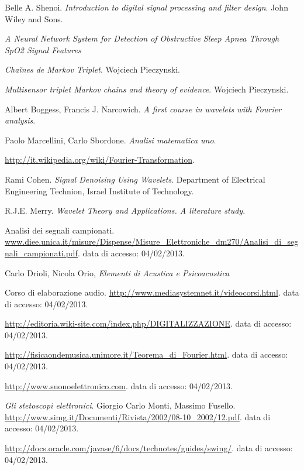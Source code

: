 \begin{thebibliography}{99}
  Belle A. Shenoi.
  \emph{Introduction to digital signal processing and filter design}.
  John Wiley and Sons.

  \emph{A Neural Network System for Detection of Obstructive Sleep Apnea Through SpO2 Signal Features}

  \emph{Cha\v ines de Markov Triplet}.
  Wojciech Pieczynski.

  \emph{Multisensor triplet Markov chains and theory of evidence}.
  Wojciech Pieczynski.


  Albert Boggess, Francis J. Narcowich.
  \emph{A first course in wavelets with Fourier analysis}.
  
  Paolo Marcellini, Carlo Sbordone.
  \emph{Analisi matematica uno}.

  \url{http://it.wikipedia.org/wiki/Fourier-Transformation}.


  Rami Cohen.
  \emph{Signal Denoising Using Wavelets}.
  Department of Electrical Engineering Technion, Israel Institute of Technology.


  R.J.E. Merry.
  \emph{Wavelet Theory and Applications. A literature study}.
   
  Analisi dei segnali campionati.
  \url{www.diee.unica.it/misure/Dispense/Misure_Elettroniche_dm270/Analisi_di_segnali_campionati.pdf}.
  data di accesso: 04/02/2013.

  Carlo Drioli, Nicola Orio,
  \emph{Elementi di Acustica e Psicoacustica}


  Corso di elaborazione audio.
  \url{http://www.mediasystemnet.it/videocorsi.html}.
  data di accesso: 04/02/2013.


  \url{http://editoria.wiki-site.com/index.php/DIGITALIZZAZIONE}.
  data di accesso: 04/02/2013.

  \url{http://fisicaondemusica.unimore.it/Teorema_di_Fourier.html}.
  data di accesso: 04/02/2013.


  \url {http://www.suonoelettronico.com}.
  data di accesso: 04/02/2013.

  \emph{Gli stetoscopi elettronici}.  
  Giorgio Carlo Monti, Massimo Fusello.
  \url{http://www.simg.it/Documenti/Rivista/2002/08-10_2002/12.pdf}.
  data di accesso: 04/02/2013.

  \url{http://docs.oracle.com/javase/6/docs/technotes/guides/swing/}.
  data di accesso: 04/02/2013.


\end{thebibliography}

